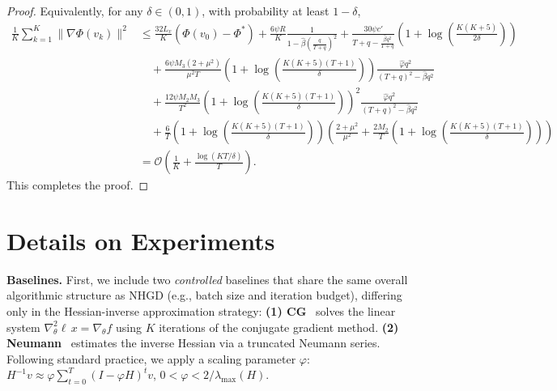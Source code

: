 \documentclass[11 pt]{article}
\begin{document}
\begin{proof}
Equivalently, for any $\delta\in (0,1)$, with probability at least $1-\delta$, 
\begin{align*}
    \frac{1}{K}\sum_{k=1}^{K}\|\nabla\Phi(v_k) \|^2 
    &\leq \frac{32L_v}{K}\left( \Phi(v_0)-\Phi^*\right) +  \frac{6\psi R}{K} \frac{1}{1-\hat{\beta}\left(\frac{q}{T+q}\right)^2} +  \frac{30\psi c'}{T+q-\frac{\hat{\beta}q^2}{T+q}} \left( 1+\log\left(\frac{K(K+5)}{2\delta} \right)\right)\nonumber\\
    &\quad +\frac{6\psi M_3(2+\mu^2)}{\mu^2T}\left(1+\log\left(\frac{K(K+5)(T+1)}{\delta}\right)\right) \frac{\hat{\varphi}q^2}{(T+q)^2-\hat{\beta}q^2}  \nonumber \\
    &\quad +\frac{12\psi M_2M_3}{T^2}\left(1+\log\left(\frac{K(K+5)(T+1)}{\delta}\right)\right)^2  \frac{\hat{\varphi}q^2}{(T+q)^2-\hat{\beta}q^2}  \nonumber \\
    &\quad + \frac{6}{T}\left(1+\log\left(\frac{K(K+5)(T+1)}{\delta}\right)\right)\left( \frac{2+\mu^2}{\mu^2} + \frac{2M_2}{T}\left(1+\log\left(\frac{K(K+5)(T+1)}{\delta}\right)\right)\right) \nonumber \\
    &=\mathcal{O}\left({\frac{1}{K}+\frac{\log(KT/\delta)}{T}}\right).
\end{align*}
This completes the proof.
\end{proof}




\newpage
\section{Details on Experiments}\label{app:experiments}
\textbf{Baselines.}  First, we include two \emph{controlled} baselines that share the same overall algorithmic structure as NHGD (e.g., batch size and iteration budget), differing only in the Hessian-inverse approximation strategy:
\textbf{(1) CG}~\cite{grazzi2020iteration,yang2023accelerating} solves the linear system
$\nabla_\theta^2 \ell\, x = \nabla_\theta f$
using $K$ iterations of the conjugate gradient method.
\textbf{(2) Neumann}~\cite{ji2021bilevel,lorraine2020optimizing} estimates the inverse Hessian via a truncated Neumann series.
Following standard practice, we apply a scaling parameter $\varphi$: $ H^{-1} v
\approx
\varphi \sum_{t=0}^{T} (I - \varphi H)^t v$, $
0 < \varphi < 2/{\lambda_{\max}(H)}$.
\end{document}
